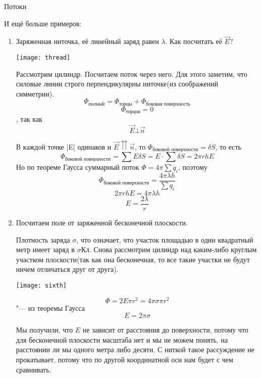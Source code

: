 \begin{section}{Потоки}
\begin{enumerate}
\end{enumerate}

И ещё больше примеров:
\begin{enumerate}

\item
	Заряженная ниточка, её линейный заряд равен $\lambda$. Как посчитать её $\vec{E}$?
	\begin{center}
	\texttt{[image: thread]}
	\end{center}

	Рассмотрим цилиндр. Посчитаем поток через него. Для этого заметим, что силовые линии строго перпендикулярны ниточке(из соображений
	симметрии).
	\[\Phi_{\text{полный}} = \Phi_{\text{торцы}} + \Phi_{\text{боковая поверхность}}\]
	\[\Phi_{\text{торцов}} = 0\], так как \[\vec{E} \bot \vec{n}\]
	
	В каждой точке |E| одинаков и $\vec{E} \upuparrows \vec{n}$, то $\Phi_{\text{боковой поверхности}} = \delta S$, то есть
	\[\Phi_{\text{боковой поверхности}} = \sum E \delta S = E \cdot \sum \delta S = 2 \pi r h E\]
	Но по теореме Гаусса суммарный поток $\Phi = 4\pi\sum q_i$, поэтому
	\[\Phi_{\text{боковой поверхности}} = \frac{4\pi\lambda h}{\sum q_i}\]
	\[2\pi r h E = 4 \pi \lambda h\]
	\[E = \frac{2 \lambda}{r}\]
	
\item
	Посчитаем поле от заряженной бесконечной плоскости.
	
	Плотность заряда $\sigma$, что означает, что участок площадью в один квадратный метр имеет заряд в $\sigma \text{Кл}$.
	Снова рассмотрим цилиндр над каким-либо круглым участком плоскости(так как она бесконечная, то все такие участки не будут
	ничем отличаться друг от друга).
	\begin{center}
	\texttt{[image: sixth]}
	\end{center}

	\[\Phi = 2E\pi r^2 = 4\pi\sigma\pi r^2\] "--- из теоремы Гаусса
	\[E = 2\pi\sigma\]
	
	Мы получили, что $E$ не зависит от расстояния до поверхности, потому что для бесконечной плоскости масштаба нет 
	и мы не можем понять, на расстоянии ли мы одного метра либо десяти. С ниткой такое рассуждение не прокатывает, потому что по другой 
	координатной оси нам будет с чем сравнивать.

\end{enumerate}

\end{section}

